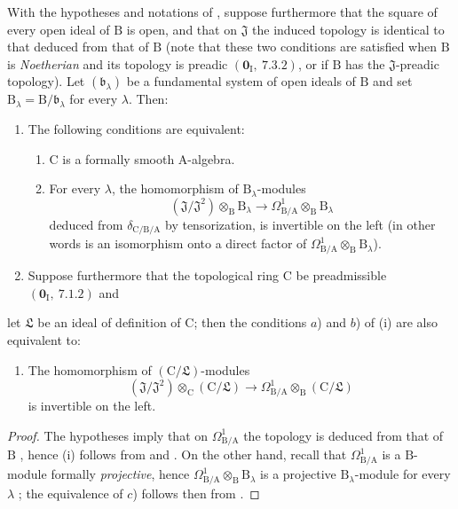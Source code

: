 \begin{corollary}[22.6.2]
\label{0.22.6.2}
With the hypotheses and notations of , suppose furthermore that the square of every open ideal of $\mathrm{B}$ is open, and that on $\mathfrak{J}$ the induced topology is identical to that deduced from that of $\mathrm{B}$  (note that these two conditions are satisfied when $\mathrm{B}$ is \emph{Noetherian} and its topology is preadic $(\mathbf{0}_\mathrm{I},~7.3.2)$, or if $\mathrm{B}$ has the $\mathfrak{J}$-preadic topology).
Let $(\mathfrak{b}_\lambda)$ be a fundamental system of open ideals of $\mathrm{B}$ and set $\mathrm{B}_\lambda=\mathrm{B}/\mathfrak{b}_\lambda$ for every $\lambda$.
Then:
\begin{enumerate}
  \item[\rm{(i)}] The following conditions are equivalent:
  \begin{enumerate}
    \item[a)] $\mathrm{C}$ is a formally smooth $\mathrm{A}$-algebra.
    \item[b)] For every $\lambda$, the homomorphism of $\mathrm{B}_\lambda$-modules
\[
\label{0.22.6.2.1}
  (\mathfrak{J}/\mathfrak{J}^2)\otimes_\mathrm{B}\mathrm{B}_\lambda\to\Omega^1_{\mathrm{B}/\mathrm{A}}\otimes_\mathrm{B}\mathrm{B}_\lambda
  \tag{22.6.2.1}
\]
  deduced from $\delta_{\mathrm{C}/\mathrm{B}/\mathrm{A}}$ by tensorization, is invertible on the left (in other words is an isomorphism onto a direct factor of $\Omega^1_{\mathrm{B}/\mathrm{A}}\otimes_\mathrm{B}\mathrm{B}_\lambda$).
  \end{enumerate}
  \item[\rm{(ii)}] Suppose furthermore that the topological ring $\mathrm{C}$ be preadmissible $(\mathbf{0}_\mathrm{I},~7.1.2)$ and
\end{enumerate}
\end{corollary}

let $\mathfrak{L}$ be an ideal of definition of $\mathrm{C}$; then the conditions $a$) and $b$) of (i) are also equivalent to:
\begin{enumerate}
  \item[c)] The homomorphism of $(\mathrm{C}/\mathfrak{L})$-modules
  \[
    (\mathfrak{J}/\mathfrak{J}^2)\otimes_\mathrm{C}(\mathrm{C}/\mathfrak{L})\to\Omega^1_{\mathrm{B}/\mathrm{A}}\otimes_\mathrm{B}(\mathrm{C}/\mathfrak{L})
  \]
  is invertible on the left.
\end{enumerate}

\begin{proof}
The hypotheses imply that on $\Omega^1_{\mathrm{B}/\mathrm{A}}$ the topology is deduced from that of $\mathrm{B}$ , hence (i) follows from  and .
On the other hand, recall  that $\Omega^1_{\mathrm{B}/\mathrm{A}}$ is a $\mathrm{B}$-module formally \emph{projective}, hence $\Omega^1_{\mathrm{B}/\mathrm{A}}\otimes_\mathrm{B}\mathrm{B}_\lambda$ is a projective $\mathrm{B}_\lambda$-module for every $\lambda$ ; the equivalence of $c$) follows then from .
\end{proof}

